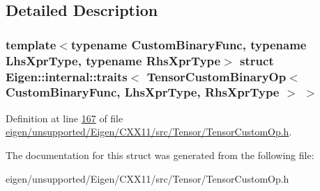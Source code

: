 \subsection{Detailed Description}
\subsubsection*{template$<$typename Custom\+Binary\+Func, typename Lhs\+Xpr\+Type, typename Rhs\+Xpr\+Type$>$\newline
struct Eigen\+::internal\+::traits$<$ Tensor\+Custom\+Binary\+Op$<$ Custom\+Binary\+Func, Lhs\+Xpr\+Type, Rhs\+Xpr\+Type $>$ $>$}



Definition at line \hyperlink{eigen_2unsupported_2_eigen_2_c_x_x11_2src_2_tensor_2_tensor_custom_op_8h_source_l00167}{167} of file \hyperlink{eigen_2unsupported_2_eigen_2_c_x_x11_2src_2_tensor_2_tensor_custom_op_8h_source}{eigen/unsupported/\+Eigen/\+C\+X\+X11/src/\+Tensor/\+Tensor\+Custom\+Op.\+h}.



The documentation for this struct was generated from the following file\+:\begin{DoxyCompactItemize}
\item 
eigen/unsupported/\+Eigen/\+C\+X\+X11/src/\+Tensor/\+Tensor\+Custom\+Op.\+h\end{DoxyCompactItemize}
